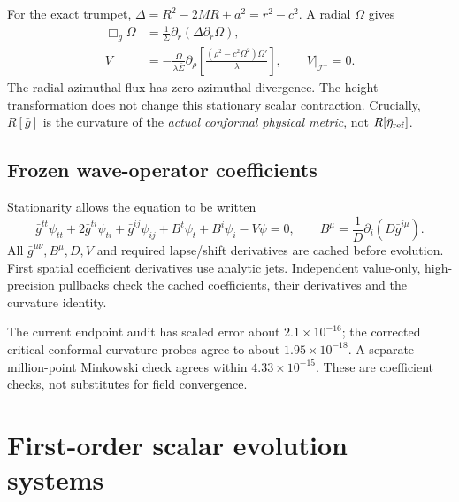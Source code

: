 \documentclass[11pt,letterpaper]{article}
\newcommand{\scri}{\mathscr{I}^{+}}
\newcommand{\G}{\bar g}
\begin{document}
For the exact trumpet, $\Delta=R^2-2MR+a^2=r^2-c^2$. A radial $\Omega$ gives
\begin{align}
 \Box_g\Omega&=\frac1\Sigma\partial_r(\Delta\partial_r\Omega),\\
 V&=-\frac{\Omega}{\lambda\bar\Sigma}\partial_\rho
 \left[\frac{(\rho^2-c^2\Omega^2)\Omega'}{\lambda}\right],
 \qquad V|_{\scri}=0.
\end{align}
The radial-azimuthal flux has zero azimuthal divergence. The height transformation does not change this stationary scalar contraction. Crucially, $R[\G]$ is the curvature of the \emph{actual conformal physical metric}, not $R[\bar\eta_{\rm ref}]$.

\subsection{Frozen wave-operator coefficients}
Stationarity allows the equation to be written
\begin{equation}\label{eq:expanded}
 \G^{tt}\psi_{tt}+2\G^{ti}\psi_{ti}+\G^{ij}\psi_{ij}
 +B^t\psi_t+B^i\psi_i-V\psi=0,\qquad
 B^\mu=\frac1D\partial_i(D\G^{i\mu}).
\end{equation}
All $\G^{\mu\nu},B^\mu,D,V$ and required lapse/shift derivatives are cached before evolution. First spatial coefficient derivatives use analytic jets. Independent value-only, high-precision pullbacks check the cached coefficients, their derivatives and the curvature identity.

The current endpoint audit has scaled error about $2.1\times10^{-16}$; the corrected critical conformal-curvature probes agree to about $1.95\times10^{-18}$. A separate million-point Minkowski check agrees within $4.33\times10^{-15}$. These are coefficient checks, not substitutes for field convergence.

\clearpage
\section{First-order scalar evolution systems}
\end{document}
